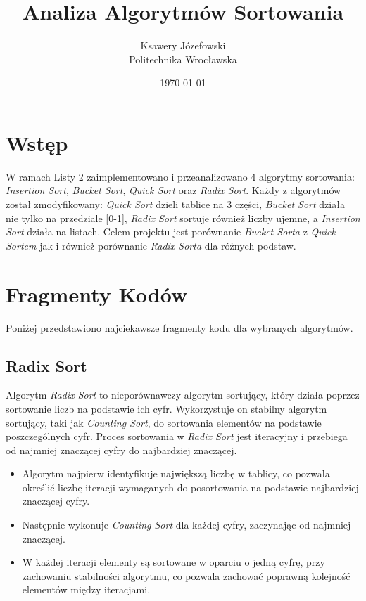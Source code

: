 \documentclass[a4paper,12pt]{article}
\title{Analiza Algorytmów Sortowania}
\author{Ksawery Józefowski\\Politechnika Wrocławska}
\date{\today}
\begin{document}
\maketitle

\tableofcontents
\newpage

\section{Wstęp}
W ramach Listy 2 zaimplementowano i przeanalizowano 4 algorytmy sortowania: \textit{Insertion Sort}, \textit{Bucket Sort}, \textit{Quick Sort} oraz \textit{Radix Sort}. Każdy z algorytmów został zmodyfikowany: \textit{Quick Sort} dzieli tablice na 3 części, \textit{Bucket Sort} działa nie tylko na przedziale [0-1], \textit{Radix Sort} sortuje również liczby ujemne, a \textit{Insertion Sort} działa na listach. Celem projektu jest porównanie \textit{Bucket Sorta} z \textit{Quick Sortem} jak i również porównanie \textit{Radix Sorta} dla różnych podstaw.

\section{Fragmenty Kodów}
Poniżej przedstawiono najciekawsze fragmenty kodu dla wybranych algorytmów.

\subsection{Radix Sort}
Algorytm \textit{Radix Sort} to nieporównawczy algorytm sortujący, który działa poprzez sortowanie liczb na podstawie ich cyfr. Wykorzystuje on stabilny algorytm sortujący, taki jak \textit{Counting Sort}, do sortowania elementów na podstawie poszczególnych cyfr. Proces sortowania w \textit{Radix Sort} jest iteracyjny i przebiega od najmniej znaczącej cyfry do najbardziej znaczącej.

\begin{itemize}
    \item Algorytm najpierw identyfikuje największą liczbę w tablicy, co pozwala określić liczbę iteracji wymaganych do posortowania na podstawie najbardziej znaczącej cyfry.
    \item Następnie wykonuje \textit{Counting Sort} dla każdej cyfry, zaczynając od 
    najmniej znaczącej. 
    \item W każdej iteracji elementy są sortowane w oparciu o jedną cyfrę, przy zachowaniu stabilności algorytmu, co pozwala zachować poprawną kolejność elementów między iteracjami.
\end{itemize}
\end{document}
